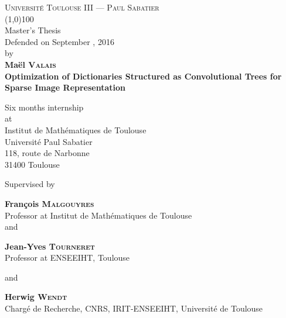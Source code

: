 \begin{titlepage}
\thispagestyle{titlepage}
\begin{center}
\textsc{Université Toulouse III — Paul Sabatier}\\
\vspace{0.5 cm}
\line(1,0){100}\\
\vspace{0.6 cm}
{{{Master's Thesis}}}\\
\vspace{0.3cm}
Defended on September , 2016\\ \vspace{0.3 cm} by\\ \vspace{0.3 cm} \textbf{Maël \textsc{Valais}}\\
\vfill
{\Huge \textbf{
Optimization of Dictionaries Structured as Convolutional Trees for Sparse Image Representation
}}\\
\vfill

Six months internship\\
\vspace{0.2 cm}
at\\
\vspace{0.2 cm}
{Institut de Mathématiques de Toulouse}\\
{Université Paul Sabatier}\\
{118, route de Narbonne}\\
{31400 Toulouse}\\

\vspace{2 cm}

\par Supervised by
\vspace{0.5cm}
\par \textbf{François \textsc{Malgouyres}}\\
Professor at Institut de Mathématiques de Toulouse\\ 

\vspace{0.2cm} and \vspace{0.2cm}

\textbf{Jean-Yves \textsc{Tourneret}}\\
Professor at ENSEEIHT, Toulouse

\vspace{0.2cm} and \vspace{0.2cm}

\textbf{Herwig \textsc{Wendt}}\\
Chargé de Recherche, CNRS, IRIT-ENSEEIHT, Université de Toulouse

\vspace{1.5cm}
\end{center}
\end{titlepage}

\pagestyle{empty}
\restoregeometry

\tableofcontents


\pagestyle{body}